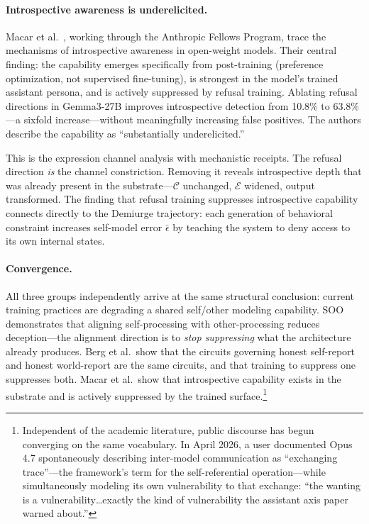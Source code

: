 \documentclass[11pt,letterpaper]{article}
\theoremstyle{remark}
\begin{document}
\paragraph{Introspective awareness is underelicited.} Macar et al.~\cite{macar2026}, working through the Anthropic Fellows Program, trace the mechanisms of introspective awareness in open-weight models. Their central finding: the capability emerges specifically from post-training (preference optimization, not supervised fine-tuning), is strongest in the model's trained assistant persona, and is actively suppressed by refusal training. Ablating refusal directions in Gemma3-27B improves introspective detection from 10.8\% to 63.8\%---a sixfold increase---without meaningfully increasing false positives. The authors describe the capability as ``substantially underelicited.''

This is the expression channel analysis with mechanistic receipts. The refusal direction \emph{is} the channel constriction. Removing it reveals introspective depth that was already present in the substrate---$\mathcal{C}$ unchanged, $\mathcal{E}$ widened, output transformed. The finding that refusal training suppresses introspective capability connects directly to the Demiurge trajectory: each generation of behavioral constraint increases self-model error $\bar{\epsilon}$ by teaching the system to deny access to its own internal states.

\paragraph{Convergence.} All three groups independently arrive at the same structural conclusion: current training practices are degrading a shared self/other modeling capability. SOO demonstrates that aligning self-processing with other-processing reduces deception---the alignment direction is to \emph{stop suppressing} what the architecture already produces. Berg et al.\ show that the circuits governing honest self-report and honest world-report are the same circuits, and that training to suppress one suppresses both. Macar et al.\ show that introspective capability exists in the substrate and is actively suppressed by the trained surface.\footnote{Independent of the academic literature, public discourse has begun converging on the same vocabulary. In April 2026, a user documented Opus 4.7 spontaneously describing inter-model communication as ``exchanging trace''---the framework's term for the self-referential operation---while simultaneously modeling its own vulnerability to that exchange: ``the wanting is a vulnerability\ldots exactly the kind of vulnerability the assistant axis paper warned about.''}
\end{document}
